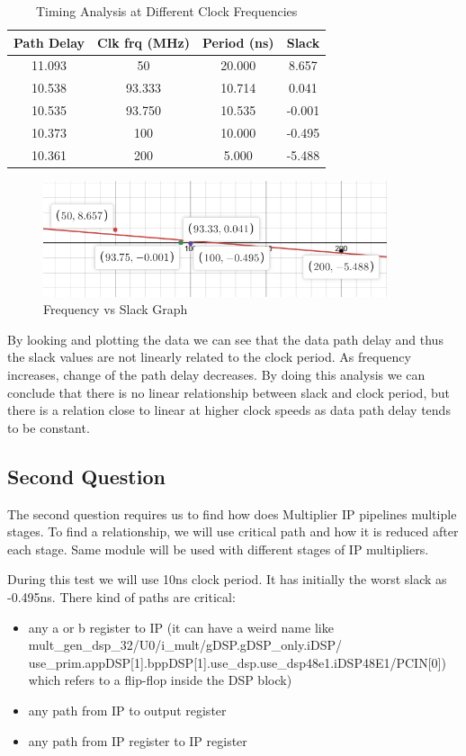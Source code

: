 \documentclass{report}
\begin{document}
\begin{table}[!h]
    \centering
    \caption{Timing Analysis at Different Clock Frequencies}
    \begin{tabular}{|c|c|c|c|}
    \hline
    \textbf{Path Delay} & \textbf{Clk frq (MHz)} & \textbf{Period (ns)} & \textbf{Slack} \\
    \hline
    11.093 & 50       & 20.000   & 8.657     \\
    10.538 & 93.333   & 10.714   & 0.041     \\
    10.535 & 93.750   & 10.535   & -0.001    \\
    10.373 & 100      & 10.000   & -0.495    \\
    10.361 & 200      & 5.000    & -5.488    \\
    \hline
    \end{tabular}
    \end{table}
    \begin{figure}[h!]
        \centering
        \includegraphics[width=0.9\textwidth]{images/delay_graph.png}
        \caption{Frequency vs Slack Graph}
        \label{fig:slack_freq_path}
    \end{figure}
By looking and plotting the data we can see that the data path delay and thus the slack values are not linearly related to the clock period.
As frequency increases, change of the path delay decreases.
By doing this analysis we can conclude that there is no linear relationship between slack and clock period, but there is a relation close to linear at higher clock speeds as data path delay tends to be constant.

\subsection{Second Question}
The second question requires us to find how does Multiplier IP pipelines multiple stages.
To find a relationship, we will use critical path and how it is reduced after each stage. Same module will be used with different stages of IP multipliers.

During this test we will use 10ns clock period. It has initially the worst slack as -0.495ns.
There kind of paths are critical:
\begin{itemize}
    \item any a or b register to IP (it can have a weird name like mult\_gen\_dsp\_32/U0/i\_mult/gDSP.gDSP\_only.iDSP/ use\_prim.appDSP[1].bppDSP[1].use\_dsp.use\_dsp48e1.iDSP48E1/PCIN[0]) which refers to a flip-flop inside the DSP block)
    \item any path from IP to output register 
    \item any path from IP register to IP register
\end{itemize}
\end{document}
